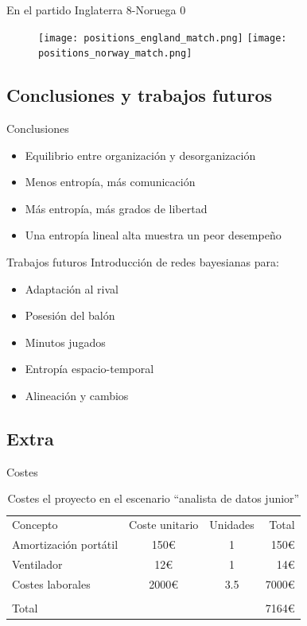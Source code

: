 \documentclass{beamer}
\begin{document}
\begin{frame}{En el partido Inglaterra 8-Noruega 0}
	\begin{figure}
		\centering
			\texttt{[image: positions\_england\_match.png]}
			\texttt{[image: positions\_norway\_match.png]}
		\end{figure}
\end{frame}

%
\subsection{Conclusiones y trabajos futuros}

\begin{frame}{Conclusiones}
	\begin{itemize}
		\item Equilibrio entre organización y desorganización
		\item Menos entropía, más comunicación
		\item Más entropía, más grados de libertad 
		\item Una entropía lineal alta muestra un peor desempeño
	\end{itemize}
\end{frame}

\begin{frame}{Trabajos futuros}
	Introducción de redes bayesianas para:
	\begin{itemize}
		\item Adaptación al rival
		\item Posesión del balón
		\item Minutos jugados
		\item Entropía espacio-temporal
		\item Alineación y cambios
	\end{itemize}
\end{frame}

\subsection{Extra}

\begin{frame}{Costes}
	\begin{table}
		\begin{tabular}[h!tbp]{lccr}
		  Concepto & Coste unitario & Unidades & Total \\
		  Amortización portátil & 150€ & 1 & 150€ \\
		  Ventilador            & 12€  & 1 & 14€ \\
		  Costes laborales      & 2000€& 3.5 & 7000€ \\
		  \hline \\
		  \multicolumn{3}{l}{Total} & 7164€ \\
		\end{tabular}
		\caption{Costes el proyecto en el escenario ``analista de datos junior''} \label{tab:costes2}
	\end{table}
\end{frame}
\end{document}
